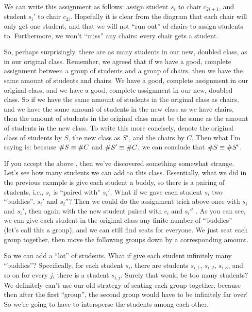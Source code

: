 \documentclass[10pt]{article}
\begin{document}
We can write this assignment as follows: assign student $s_i$ to chair $c_{2i+1}$, and student $s_i'$ to chair $c_{2i}$.
Hopefully it is clear from the diagram that each chair will only get one student, and that we will not ``run out'' of chairs to assign students to.
Furthermore, we won't ``miss'' any chairs: every chair gets a student.

So, perhaps surprisingly, there are as many students in our new, doubled class, as in our original class.
Remember, we agreed that if we have a good, complete assignment between a group of students and a group of chairs, then we have the same amount of students and chairs.
We have a good, complete assignment in our original class, and we have a good, complete assignment in our new, doubled class.
So if we have the same amount of students in the original class as chairs, and we have the same amount of students in the new class as we have chairs, then the amount of students in the original class must be the same as the amount of students in the new class.
To write this more concisely, denote the original class of students by $S$, the new class as $S'$, and the chairs by $C$.
Then what I'm saying is: because $\# S \equiv \# C$ and $\# S' \equiv \# C$, we can conclude that $\# S \equiv \# S'$.

If you accept the above , then we've discovered something somewhat strange.
Let's see how many students we can add to this class.
Essentially, what we did in the previous example is give each student a buddy, so there is a pairing of students, i.e., $s_i$ is ``paired with'' $s_i'$.
What if we gave each student $s_i$ two ``buddies'', $s_i'$ and $s_i''$?
Then we could do the assignment trick above once with $s_i$ and $s_i'$, then again with the new student paired with $c_i$ and $s_i''$ .
As you can see, we can give each student in the original class any finite number of ``buddies'' (let's call this a group), and we can still find seats for everyone.
We just seat each group together, then move the following groups down by a corresponding amount.

So we can add a ``lot'' of students.
What if give each student infinitely many ``buddies''?
Specifically, for each student $s_i$, there are students $s_{i,1}$, $s_{i,2}$, $s_{i,3}$, and so on for every  $j$, there is a student $s_{i,j}$.
Surely that would be too many students?
We definitely can't use our old strategy of seating each group together, because then after the first ``group'', the second group would have to be infinitely far over!
So we're going to have to intersperse the students among each other.
\end{document}

